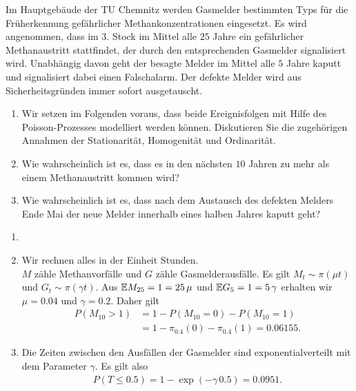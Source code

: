   Im Hauptgebäude der TU Chemnitz werden Gasmelder
bestimmten Typs für die Früherkennung gefährlicher Methankonzentrationen
eingesetzt. Es wird angenommen, dass im $3.$ Stock im Mittel alle $25$ Jahre
ein gefährlicher Methanaustritt stattfindet, der durch den entsprechenden
Gasmelder signalisiert wird. Unabhängig davon geht der besagte Melder im Mittel
alle $5$ Jahre kaputt und signalisiert dabei einen Falschalarm. Der defekte Melder
wird aus Sicherheitsgründen immer sofort ausgetauscht.
\begin{enumerate}
    \item Wir setzen im Folgenden voraus, dass beide Ereignisfolgen mit Hilfe
        des Poisson-Prozesses modelliert werden können. Diskutieren Sie die
        zugehörigen Annahmen der Stationarität, Homogenität und Ordinarität.

    \item Wie wahrscheinlich ist es, dass es in den nächsten $10$ Jahren zu mehr als
        einem Methanaustritt kommen wird?

    \item Wie wahrscheinlich ist es, dass nach dem Austausch des defekten Melders Ende Mai der neue Melder innerhalb eines halben Jahres kaputt geht?
\end{enumerate}

\solution
\begin{enumerate}
    \item 
    \item Wir rechnen alles in der Einheit Stunden.\\$M$ zähle Methanvorfälle und $G$ zähle Gasmelderausfälle.  Es
        gilt $M_t \sim \pi(\mu t)$ und $G_t \sim \pi(\gamma t)$. Aus $\mathbb{E}
        M_{25}=1=25\, \mu$ und $\mathbb{E} G_5 = 1 = 5\, \gamma$ erhalten wir
        $\mu=0.04$ und $\gamma=0.2$. Daher gilt
        \begin{align*}
            P( M_{10} > 1) &= 1 - P(M_{10}=0) - P(M_{10}=1)\\
           &= 1-\pi_{0.4}(0)-\pi_{0.4}(1)=0.06155.
        \end{align*}
    \item Die Zeiten zwischen den Ausfällen der Gasmelder sind
        exponentialverteilt mit dem Parameter $\gamma$. Es gilt also
        \begin{align*}
            P( T \leq 0.5 ) = 1 - \exp(-\gamma\, 0.5) = 0.0951. 
        \end{align*}
\end{enumerate}

